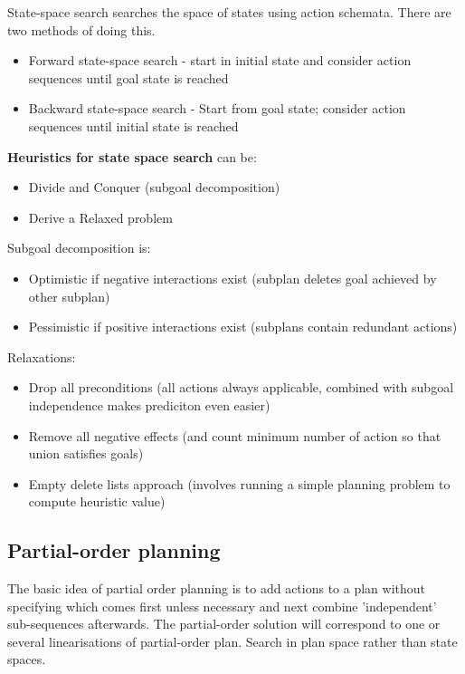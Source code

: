 \documentclass{article}
\begin{document}
State-space search searches the space of states using action schemata. There are two methods of doing this.

\begin{itemize}
    \item Forward state-space search - start in initial state and consider action sequences until goal state is reached
    \item Backward state-space search - Start from goal state; consider action sequences until initial state is reached
\end{itemize}

\textbf{Heuristics for state space search} can be:
\begin{itemize}
    \item Divide and Conquer (subgoal decomposition)
    \item Derive a Relaxed problem
\end{itemize}

Subgoal decomposition is:
\begin{itemize}
    \item Optimistic if negative interactions exist (subplan deletes goal achieved by other subplan)
    \item Pessimistic if positive interactions exist (subplans contain redundant actions)
\end{itemize}

Relaxations:
\begin{itemize}
    \item Drop all preconditions (all actions always applicable, combined with subgoal independence makes prediciton even easier)
    \item Remove all negative effects (and count minimum number of action so that union satisfies goals)
    \item Empty delete lists approach (involves running a simple planning problem to compute heuristic value)
\end{itemize}

\subsection{Partial-order planning}

The basic idea of partial order planning is to add actions to a plan without specifying which comes first unless necessary and next combine 'independent' sub-sequences afterwards. The partial-order solution will correspond to one or several linearisations of partial-order plan. Search in plan space rather than state spaces. 
\end{document}
